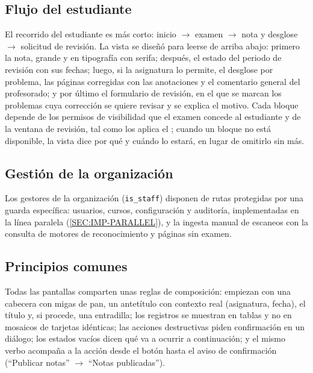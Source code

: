 \subsection{Flujo del estudiante}

El recorrido del estudiante es más corto: inicio $\rightarrow$ examen $\rightarrow$ nota y
desglose $\rightarrow$ solicitud de revisión. La vista se diseñó para leerse de arriba
abajo: primero la nota, grande y en tipografía con serifa; después, el estado del periodo
de revisión con sus fechas; luego, si la asignatura lo permite, el desglose por problema,
las páginas corregidas con las anotaciones y el comentario general del profesorado; y por
último el formulario de revisión, en el que se marcan los problemas cuya corrección se
quiere revisar y se explica el motivo. Cada bloque depende de los permisos de visibilidad
que el examen concede al estudiante y de la ventana de revisión, tal como los aplica el
; cuando un bloque no está disponible, la vista dice por qué y cuándo lo
estará, en lugar de omitirlo sin más.

\subsection{Gestión de la organización}

Los gestores de la organización (\texttt{is\_staff}) disponen de rutas protegidas por una
guarda específica: usuarios, cursos, configuración y auditoría, implementadas en la línea
paralela (\cref{SEC:IMP-PARALLEL}), y la ingesta manual de escaneos con la consulta de
motores de reconocimiento y páginas sin examen.

\subsection{Principios comunes}

Todas las pantallas comparten unas reglas de composición: empiezan con una cabecera con
migas de pan, un antetítulo con contexto real (asignatura, fecha), el título y, si procede,
una entradilla; los registros se muestran en tablas y no en mosaicos de tarjetas idénticas;
las acciones destructivas piden confirmación en un diálogo; los estados vacíos dicen qué
va a ocurrir a continuación; y el mismo verbo acompaña a la acción desde el botón hasta el
aviso de confirmación (``Publicar notas'' $\rightarrow$ ``Notas publicadas'').

